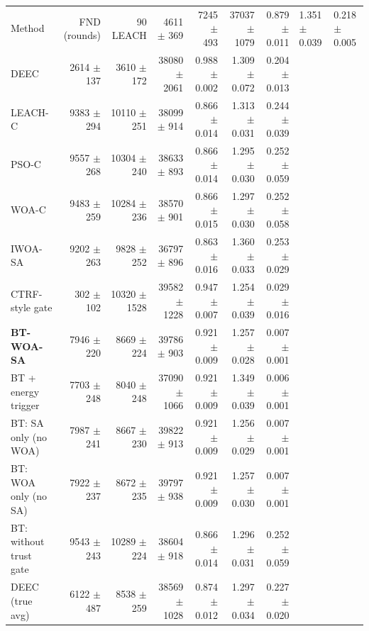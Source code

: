 \begin{tabular}{lrrrrrr}
\toprule
Method & FND (rounds) & 90 %
\midrule
LEACH & 4611 $\pm$ 369 & 7245 $\pm$ 493 & 37037 $\pm$ 1079 & 0.879 $\pm$ 0.011 & 1.351 $\pm$ 0.039 & 0.218 $\pm$ 0.005 \\
DEEC & 2614 $\pm$ 137 & 3610 $\pm$ 172 & 38080 $\pm$ 2061 & 0.988 $\pm$ 0.002 & 1.309 $\pm$ 0.072 & 0.204 $\pm$ 0.013 \\
LEACH-C & 9383 $\pm$ 294 & 10110 $\pm$ 251 & 38099 $\pm$ 914 & 0.866 $\pm$ 0.014 & 1.313 $\pm$ 0.031 & 0.244 $\pm$ 0.039 \\
PSO-C & 9557 $\pm$ 268 & 10304 $\pm$ 240 & 38633 $\pm$ 893 & 0.866 $\pm$ 0.014 & 1.295 $\pm$ 0.030 & 0.252 $\pm$ 0.059 \\
WOA-C & 9483 $\pm$ 259 & 10284 $\pm$ 236 & 38570 $\pm$ 901 & 0.866 $\pm$ 0.015 & 1.297 $\pm$ 0.030 & 0.252 $\pm$ 0.058 \\
IWOA-SA & 9202 $\pm$ 263 & 9828 $\pm$ 252 & 36797 $\pm$ 896 & 0.863 $\pm$ 0.016 & 1.360 $\pm$ 0.033 & 0.253 $\pm$ 0.029 \\
CTRF-style gate & 302 $\pm$ 102 & 10320 $\pm$ 1528 & 39582 $\pm$ 1228 & 0.947 $\pm$ 0.007 & 1.254 $\pm$ 0.039 & 0.029 $\pm$ 0.016 \\
\textbf{BT-WOA-SA} & 7946 $\pm$ 220 & 8669 $\pm$ 224 & 39786 $\pm$ 903 & 0.921 $\pm$ 0.009 & 1.257 $\pm$ 0.028 & 0.007 $\pm$ 0.001 \\
BT + energy trigger & 7703 $\pm$ 248 & 8040 $\pm$ 248 & 37090 $\pm$ 1066 & 0.921 $\pm$ 0.009 & 1.349 $\pm$ 0.039 & 0.006 $\pm$ 0.001 \\
BT: SA only (no WOA) & 7987 $\pm$ 241 & 8667 $\pm$ 230 & 39822 $\pm$ 913 & 0.921 $\pm$ 0.009 & 1.256 $\pm$ 0.029 & 0.007 $\pm$ 0.001 \\
BT: WOA only (no SA) & 7922 $\pm$ 237 & 8672 $\pm$ 235 & 39797 $\pm$ 938 & 0.921 $\pm$ 0.009 & 1.257 $\pm$ 0.030 & 0.007 $\pm$ 0.001 \\
BT: without trust gate & 9543 $\pm$ 243 & 10289 $\pm$ 224 & 38604 $\pm$ 918 & 0.866 $\pm$ 0.014 & 1.296 $\pm$ 0.031 & 0.252 $\pm$ 0.059 \\
DEEC (true avg) & 6122 $\pm$ 487 & 8538 $\pm$ 259 & 38569 $\pm$ 1028 & 0.874 $\pm$ 0.012 & 1.297 $\pm$ 0.034 & 0.227 $\pm$ 0.020 \\
\bottomrule
\end{tabular}